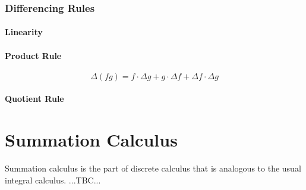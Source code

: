 





\subsubsection{Differencing Rules}  



\paragraph{Linearity}

\paragraph{Product Rule}
\begin{equation}
 \Delta (f g) = f \cdot \Delta g + g \cdot \Delta f + \Delta f \cdot \Delta g
\end{equation}



\paragraph{Quotient Rule}



\section{Summation Calculus}
Summation calculus is the part of discrete calculus that is analogous to the usual integral calculus. ...TBC...



